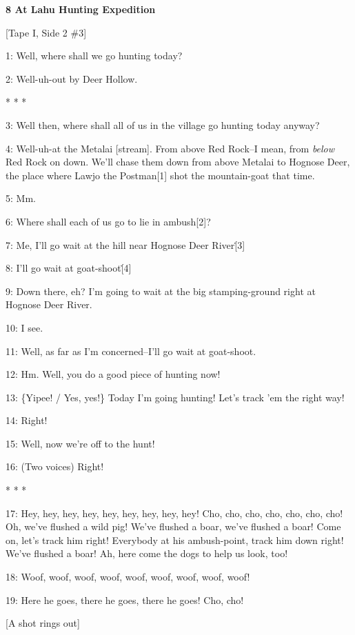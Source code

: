 
\textbf{8 At Lahu Hunting Expedition}

[Tape I, Side 2 \#3]

1: Well, where shall we go hunting today?

2: Well-uh-out by Deer Hollow.

\begin{center}
* * *
\end{center}

\leftskip=0pt
3: Well then, where shall all of us in the village go hunting today anyway?

4: Well-uh-at the Metalai [stream]. From above Red Rock--I mean, from \textit{below}
Red Rock on down. We'll chase them down from above Metalai to Hognose Deer, the
place where Lawjo the Postman[1] shot the mountain-goat that time.

5: Mm.

6: Where shall each of us go to lie in ambush[2]?

7: Me, I'll go wait at the hill near Hognose Deer River\.[3]

8: I'll go wait at goat-shoot\.[4]

9: Down there, eh? I'm going to wait at the big stamping-ground right at Hognose
Deer River.

10: I see.

11: Well, as far as I'm concerned--I'll go wait at goat-shoot.

12: Hm. Well, you do a good piece of hunting now!

13: \{Yipee! / Yes, yes!\} Today I'm going hunting! Let's track 'em the right way!

14: Right!

15: Well, now we're off to the hunt!

16: (Two voices) Right!

\begin{center}
* * *
\end{center}

\leftskip=0pt
17: Hey, hey, hey, hey, hey, hey, hey, hey, hey!  Cho, cho, cho, cho, cho, cho,
cho! Oh, we've flushed a wild pig! We've flushed a boar, we've flushed a boar!
Come on, let's track him right! Everybody at his ambush-point, track him down right!
We've flushed a boar! Ah, here come the dogs to help us look, too!

18: Woof, woof, woof, woof, woof, woof, woof, woof, woof!

19: Here he goes, there he goes, there he goes! Cho, cho!

[A shot rings out]

